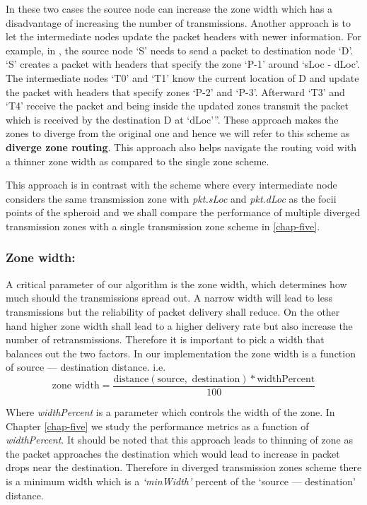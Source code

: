 In these two cases the source node can increase the zone width which has a disadvantage of increasing the number of transmissions. Another approach is to let the intermediate nodes update the packet headers with newer information. For example, in , the source node `S' needs to send a packet to destination node `D'. `S' creates a packet with headers that specify the zone `P-1' around `sLoc - dLoc'. The intermediate nodes `T0' and `T1' know the current location of D and update the packet with headers that specify zones `P-2' and  `P-3'. Afterward `T3' and `T4' receive the packet and being inside the updated zones transmit the packet which is received by the destination D at `dLoc'''. These approach makes the zones to diverge from the original one and hence we will refer to this scheme as \textbf{diverge zone routing}. This approach also helps navigate the routing void with a thinner zone width as compared to the single zone scheme. 

This approach is in contrast with the scheme where every intermediate node considers the same transmission zone with \emph{pkt.sLoc} and \emph{pkt.dLoc} as the focii points of the spheroid and we shall compare the performance of multiple diverged transmission zones with a single transmission zone scheme in \ref{chap-five}.

\subsubsection{Zone width:}
\label{zone_width}
A critical parameter of our algorithm is the zone width, which determines how much should the transmissions spread out. A narrow width will lead to less transmissions but the reliability of packet delivery shall reduce. On the other hand higher zone width shall lead to a higher delivery rate but also increase the number of retransmissions. Therefore it is important to pick a width that balances out the two factors. In our implementation the zone width is a function of source --- destination distance. i.e. 
\begin{equation}
    \text{zone width} = \dfrac{\text{distance}(\text{source}, \text{ destination}) * \text{widthPercent}}{100}
\end{equation}

Where \emph{widthPercent} is a parameter which controls the width of the zone. In Chapter \ref{chap-five} we study the performance metrics as a function of \emph{widthPercent}. It should be noted that this approach leads to thinning of zone as the packet approaches the destination which would lead to increase in packet drops near the destination. Therefore in diverged transmission zones scheme there is a minimum width which is a \emph{`minWidth'} percent of the `source --- destination' distance.

